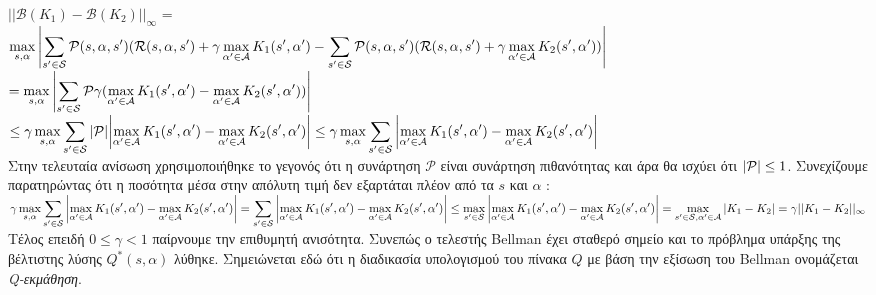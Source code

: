 \documentclass[11pt]{article} %
\numberwithin{equation}{subsection}
\begin{document}
$\displaystyle ||\mathcal{B}(K_1) - \mathcal{B}(K_2)||_{\infty}$ =\\ 

$\displaystyle \max_{s, \alpha}  \abs{ \sum_{s' \in \mathcal{S}} \mathcal{P}(s, \alpha, s') (\mathcal{R}(s, \alpha, s') + \gamma \max_{\alpha ' \in \mathcal{A}} K_1 (s', \alpha ') \\
\displaystyle -\sum_{s' \in \mathcal{S}} \mathcal{P}(s, \alpha, s') (\mathcal{R}(s, \alpha, s') + \gamma \max_{\alpha ' \in \mathcal{A}} K_2 (s', \alpha '))} $\\

$\displaystyle= \max_{s, \alpha} \abs{ \sum_{s' \in \mathcal{S}} \mathcal{P} \gamma (\max_{\alpha ' \in \mathcal{A}} K_1 (s', \alpha ') -\max_{\alpha ' \in \mathcal{A}} K_2 (s', \alpha ')) }$\\

$\displaystyle \leq \gamma \max_{s, \alpha}  \sum_{s' \in \mathcal{S}} \abs{ \mathcal{P}} \abs{\max_{\alpha ' \in \mathcal{A}} K_1 (s', \alpha ') -\max_{\alpha ' \in \mathcal{A}} K_2 (s', \alpha ')} \leq \gamma  \max_{s, \alpha}  \sum_{s' \in \mathcal{S}}\abs{\max_{\alpha ' \in \mathcal{A}} K_1 (s', \alpha ') -\max_{\alpha ' \in \mathcal{A}} K_2 (s', \alpha ')}  $\\

Στην τελευταία ανίσωση χρησιμοποιήθηκε το γεγονός ότι η συνάρτηση $\mathcal{P}$ είναι συνάρτηση πιθανότητας και άρα θα ισχύει ότι $\abs{\mathcal{P}} \leq 1$. Συνεχίζουμε παρατηρώντας ότι η ποσότητα μέσα στην απόλυτη τιμή δεν εξαρτάται πλέον από τα $s$ και $\alpha$ :\\

$\displaystyle \gamma  \max_{s, \alpha}  \sum_{s' \in \mathcal{S}}\abs{\max_{\alpha ' \in \mathcal{A}} K_1 (s', \alpha ') -\max_{\alpha ' \in \mathcal{A}} K_2 (s', \alpha ')} =  \sum_{s' \in \mathcal{S}}\abs{\max_{\alpha ' \in \mathcal{A}} K_1 (s', \alpha ') -\max_{\alpha ' \in \mathcal{A}} K_2 (s', \alpha ')} \leq \max_{s' \in \mathcal{S}} \abs{\max_{\alpha ' \in \mathcal{A}} K_1 (s', \alpha ') -\max_{\alpha ' \in \mathcal{A}} K_2 (s', \alpha ')} = \max_{s' \in \mathcal{S}, \alpha ' \in \mathcal{A}} \abs{K_1 - K_2} = \gamma ||K_1 - K_2||_{\infty}$\\

Τέλος επειδή $0 \leq \gamma < 1$ παίρνουμε την επιθυμητή ανισότητα. Συνεπώς ο τελεστής Bellman έχει σταθερό σημείο και το πρόβλημα υπάρξης της βέλτιστης λύσης $Q^*(s,\alpha)$ λύθηκε. Σημειώνεται εδώ ότι η διαδικασία υπολογισμού του πίνακα $Q$ με βάση την εξίσωση του Bellman ονομάζεται \textit{Q-εκμάθηση}.\\
\end{document}
